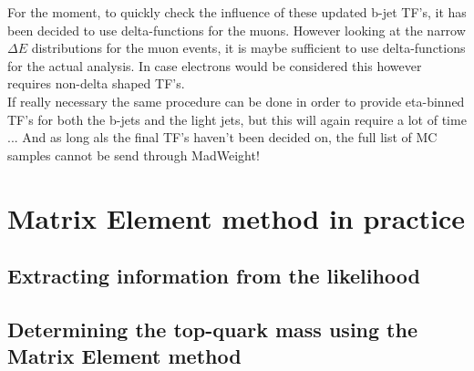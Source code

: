 For the moment, to quickly check the influence of these updated b-jet TF's, it has been decided to use delta-functions for the muons. However looking at the narrow $\Delta E$ distributions for the muon events, it is maybe sufficient to use delta-functions for the actual analysis.
In case electrons would be considered this however requires non-delta shaped TF's.\\
If really necessary the same procedure can be done in order to provide eta-binned TF's for both the b-jets and the light jets, but this will again require a lot of time ... And as long als the final TF's haven't been decided on, the full list of MC samples cannot be send through MadWeight!

\section{Matrix Element method in practice}
\subsection{Extracting information from the likelihood}
\subsection{Determining the top-quark mass using the Matrix Element method}

